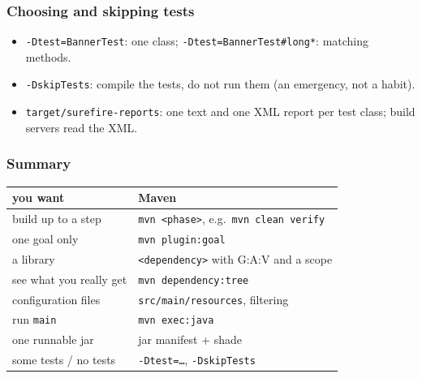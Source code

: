 \documentclass[aspectratio=169,10pt,compress]{beamer}
\begin{document}




\begin{frame}[t,fragile] \frametitle{Choosing and skipping tests}

  \vspace{0.1em}
  \small
  \begin{itemize}
    \item \texttt{-Dtest=BannerTest}: one class; \texttt{-Dtest=BannerTest\#long*}: matching methods.
    \item \texttt{-DskipTests}: compile the tests, do not run them (an emergency, not a habit).
    \item \texttt{target/surefire-reports}: one text and one XML report per test class; build servers read the XML.
  \end{itemize}
\end{frame}





\begin{frame}[t,fragile] \frametitle{Summary}
  \begin{center}\small
  \begin{tabular}{@{}L{0.42\textwidth}L{0.5\textwidth}@{}}
    \toprule
    \textbf{you want}                       & \textbf{Maven} \\
    \midrule
    build up to a step                      & \texttt{mvn <phase>}, e.g.\ \texttt{mvn clean verify} \\
    one goal only                           & \texttt{mvn plugin:goal} \\
    a library                               & \texttt{<dependency>} with G:A:V and a scope \\
    see what you really get                 & \texttt{mvn dependency:tree} \\
    configuration files                     & \texttt{src/main/resources}, filtering \\
    run \texttt{main}                       & \texttt{mvn exec:java} \\
    one runnable jar                        & jar manifest + shade \\
    some tests / no tests                   & \texttt{-Dtest=\dots}, \texttt{-DskipTests} \\
    \bottomrule
  \end{tabular}
  \end{center}
\end{frame}
\end{document}
